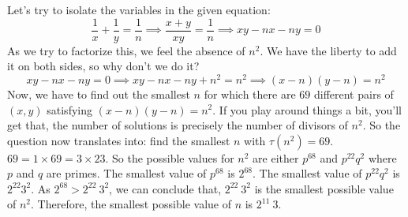 \documentclass[11pt]{scrartcl}
\begin{document}
\begin{soln}
Let's try to isolate the variables in the given equation:
\[\frac1x + \frac1y = \frac1n \implies \frac{x+y}{xy}= \frac{1}{n} \implies xy - nx -ny =0\]
As we try to factorize this, we feel the absence of \(n^2\). We have the liberty to add it on both sides, so why don't we do it?
\[xy - nx -ny =0 \implies xy - nx -ny +n^2=n^2 \implies \boxed{(x-n)(y-n) = n^2}\]
Now, we have to find out the smallest \(n\) for which there are \(69\) different pairs of \((x,y)\) satisfying \((x-n)(y-n) = n^2\). If you play around things a bit, you'll get that, the number of solutions is precisely the number of divisors of \(n^2\). So the question now translates into: find the smallest \(n\) with \(\tau(n^2)=69\).\\
\(69 = 1\times 69 = 3 \times 23\). So the possible values for \(n^2\) are either \(p^{68}\) and \(p^{22}q^2\) where \(p\) and \(q\) are primes. The smallest value of \(p^{68}\) is \(2^{68}\). The smallest value of \(p^{22}q^2\) is \(2^{22}3^2\). As \(2^{68} > 2^{22}\ 3^2\), we can conclude that, \(2^{22}\ 3^2\) is the smallest possible value of \(n^2\). Therefore, the smallest possible value of \(n\) is \(2^{11}\ 3\).
\end{soln}
\end{document}

